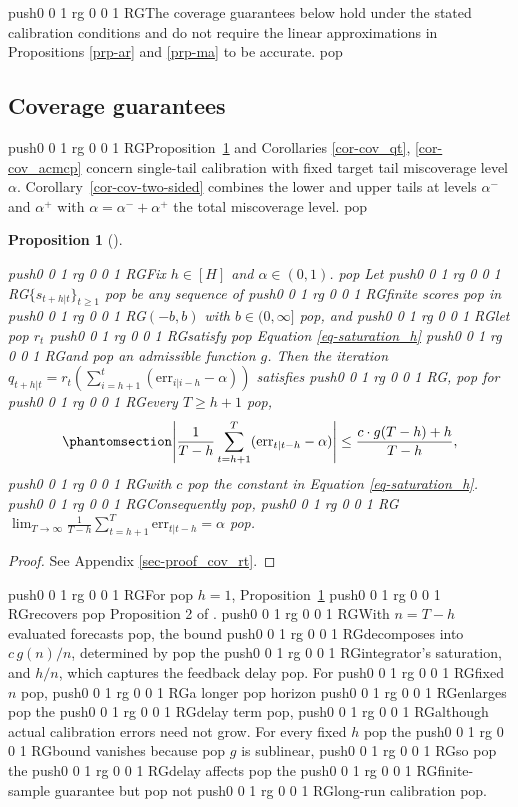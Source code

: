 \documentclass[
  american,
  12pt]{article}
\theoremstyle{plain}
\newtheorem{proposition}{Proposition}[section]
\theoremstyle{plain}
\theoremstyle{remark}
\newcommand{\CPTSadd}[1]{\ifmmode\else\leavevmode\fi\pdfcolorstack 0 push{0 0 1 rg 0 0 1 RG}#1\pdfcolorstack 0 pop}
\begin{document}
\CPTSadd{The coverage guarantees below hold under the stated calibration
conditions and do not require the linear approximations in Propositions
\ref{prp-ar} and \ref{prp-ma} to be accurate.}

\subsection{Coverage guarantees}\label{sec-cov}

\CPTSadd{Proposition~\ref{prp-cov_rt} and Corollaries
\ref{cor-cov_qt}, \ref{cor-cov_acmcp} concern single-tail calibration
with fixed target tail miscoverage level \(\alpha\).
Corollary~\ref{cor-cov-two-sided} combines the lower and upper tails at
levels \(\alpha^{-}\) and \(\alpha^{+}\) with
\(\alpha=\alpha^{-}+\alpha^{+}\) the total miscoverage level.}

\begin{proposition}[]\protect\hypertarget{prp-cov_rt}{}\label{prp-cov_rt}

\CPTSadd{Fix \(h\in[H]\) and \(\alpha\in(0,1)\).} Let \CPTSadd{\(\{s_{t+h|t}\}_{t\geq1}\)}
be any sequence of \CPTSadd{finite scores} in \CPTSadd{\((-b,b)\) with \(b\in(0,\infty]\)},
and \CPTSadd{let} \(r_t\) \CPTSadd{satisfy} Equation \eqref{eq-saturation_h} \CPTSadd{and} an
admissible function \(g\). Then the iteration
\(q_{t+h|t}=r_t\left(\sum_{i=h+1}^t(\mathrm{err}_{i|i-h}-\alpha)\right)\)
satisfies\CPTSadd{,} for \CPTSadd{every \(T\geq h+1\)},
\begin{equation}\phantomsection\label{eq-cov_rt}{
\left|\frac{1}{T-h}\sum_{t=h+1}^{T}(\mathrm{err}_{t|t-h}-\alpha)\right| \leq \frac{c \cdot g(T-h) + h}{T-h},
}\end{equation} \CPTSadd{with \(c\)} the constant in Equation
\eqref{eq-saturation_h}. \CPTSadd{Consequently},
\CPTSadd{\(\lim_{T\to\infty}\frac{1}{T-h}\sum_{t=h+1}^{T}\mathrm{err}_{t|t-h}=\alpha\)}.

\end{proposition}

\begin{proof}
See Appendix \ref{sec-proof_cov_rt}.
\end{proof}

\CPTSadd{For} \(h=1\), Proposition~\ref{prp-cov_rt} \CPTSadd{recovers} Proposition 2 of
\citet{angelopoulos2024}. \CPTSadd{With \(n=T-h\) evaluated forecasts}, the bound
\CPTSadd{decomposes into \(c\,g(n)/n\), determined by} the \CPTSadd{integrator's
saturation, and \(h/n\), which captures the feedback delay}. For \CPTSadd{fixed
\(n\)}, \CPTSadd{a longer} horizon \CPTSadd{enlarges} the \CPTSadd{delay term}, \CPTSadd{although actual
calibration errors need not grow. For every fixed \(h\)} the \CPTSadd{bound
vanishes because} \(g\) is sublinear, \CPTSadd{so} the \CPTSadd{delay affects} the
\CPTSadd{finite-sample guarantee but} not \CPTSadd{long-run calibration}.
\end{document}

